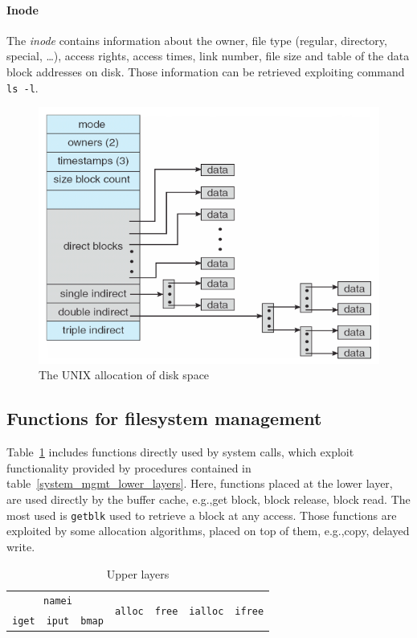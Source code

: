 \paragraph{Inode} The \emph{inode} contains information about the owner, file type (regular, directory, special, \dots), access rights, access times, link number, file size and table of the data block addresses on disk. Those information can be retrieved exploiting command \texttt{ls -l}.

\begin{figure}[hbtp]
\centering
\includegraphics[scale=0.35]{images/file_system/unix_combined_scheme.png}
\caption{The UNIX allocation of disk space}
\end{figure}

\subsection{Functions for filesystem management}
Table~\ref{system_mgmt_upper_layers} includes functions directly used by system calls, which exploit functionality provided by procedures contained in table~\ref{system_mgmt_lower_layers}. Here, functions placed at the lower layer, are used directly by the buffer cache, e.g.,\@ get block, block release, block read. The most used is \texttt{getblk} used to retrieve a block at any access. Those functions are exploited by some allocation algorithms, placed on top of them, e.g.,\@ copy, delayed write.

\begin{table}
\centering
\begin{tabular}{|c|c|c|cc|cc|}
\hline 
\multicolumn{3}{|c|}{\texttt{namei}} & \multirow{2}{*}{\texttt{alloc}} & \multirow{2}{*}{\texttt{free}} & \multirow{2}{*}{\texttt{ialloc}} & \multirow{2}{*}{\texttt{ifree}} \\\cline{1-3} 
\texttt{iget} & \texttt{iput} & \texttt{bmap} & & & & \\ 
\hline 
\end{tabular}
\caption{Upper layers}
\label{system_mgmt_upper_layers}
\end{table} 

